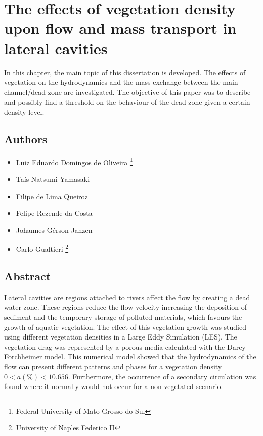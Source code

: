 \chapter{The effects of vegetation density upon flow and mass transport in lateral cavities}
\label{chap:art4}
In this chapter, the main topic of this dissertation is developed. The effects of vegetation on the hydrodynamics and the mass exchange between the main channel/dead zone are investigated. The objective of this paper was to describe and possibly find a threshold on the behaviour of the dead zone given a certain density level.

\section*{Authors}
\begin{itemize}
    \item Luiz Eduardo Domingos de Oliveira \footnote{Federal University of Mato Grosso do Sul}
    \item Taís Natsumi Yamasaki \footnotemark[1]
    \item Filipe de Lima Queiroz \footnotemark[1]
    \item Felipe Rezende da Costa \footnotemark[1]
    \item Johannes Gérson Janzen \footnotemark[1]
    \item Carlo Gualtieri \footnote{University of Naples Federico II}
\end{itemize}

\section*{Abstract}
Lateral cavities are regions attached to rivers affect the flow by creating a dead water zone. These regions reduce the flow velocity increasing the deposition of sediment and the temporary storage of polluted materials, which favours the growth of aquatic vegetation. The effect of this vegetation growth was studied using different vegetation densities in a Large Eddy Simulation (LES). The vegetation drag was represented by a porous media calculated with the Darcy-Forchheimer model. This numerical model showed that the hydrodynamics of the flow can present different patterns and phases for a vegetation density $0<a(\%)<10.656$. Furthermore, the occurrence of a secondary circulation was found where it normally would not occur for a non-vegetated scenario.

